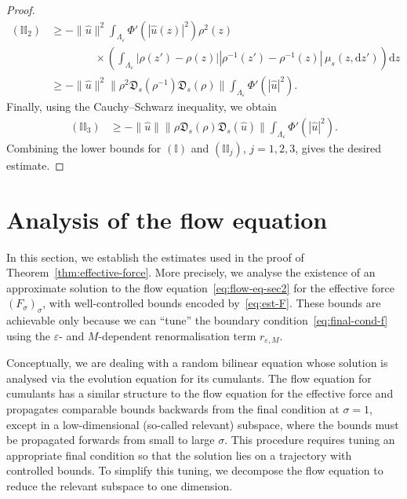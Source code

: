 \documentclass{article}
\numberwithin{equation}{section}
\newcommand{\mathd}{\mathrm{d}}
\theoremstyle{plain}
\theoremstyle{definition}
\begin{document}
\begin{proof}
  \[
  \begin{aligned}
  	(\mathbb{I}\mathbb{I}_2)
  	&\geqslant
  	-\|\hat u\|^2
  	\int_{\Lambda_\varepsilon}
  	\Phi'(|\hat u(z)|^2)\rho^2(z)
  	\\
  	&\qquad\qquad \times
  	\left(
  	\int_{\Lambda_\varepsilon}
  	|\rho(z')-\rho(z)|
  	|\rho^{-1}(z')-\rho^{-1}(z)|
  	\,\mu_s(z,\mathd z')
  	\right)\mathd z
  	\\
  	&\geqslant
  	-\|\hat u\|^2
  	\|\rho^2\mathfrak D_s(\rho^{-1})\mathfrak D_s(\rho)\|
  	\int_{\Lambda_\varepsilon}
  	\Phi'(|\hat u|^2).
  \end{aligned}
  \]
  Finally, using the Cauchy--Schwarz inequality, we obtain
  \[ \begin{aligned}
       (\mathbb{I}\mathbb{I}_3) & \geqslant  - \| \hat{u} \|  \| \rho
       \mathfrak{D}_s (\rho) \mathfrak{D}_s (\hat{u}) \|
       \int_{\Lambda_{\varepsilon}} \Phi' (| \hat{u} |^2) .
     \end{aligned} \]
  Combining the lower bounds for \((\mathbb I)\) and
     \((\mathbb{I}\mathbb{I}_j)\), \(j=1,2,3\), gives the desired estimate.
\end{proof}

\section{Analysis of the flow equation}\label{sec:flow}

In this section, we establish the estimates used in the proof of
Theorem~\ref{thm:effective-force}. More precisely, we analyse the existence of
an approximate solution to the flow equation~\eqref{eq:flow-eq-sec2} for the
effective force $(F_{\sigma})_{\sigma}$, with well-controlled bounds encoded
by~\eqref{eq:est-F}. These bounds are achievable only because we can ``tune''
the boundary condition~\eqref{eq:final-cond-f} using the $\varepsilon$- and
$M$-dependent renormalisation term $r_{\varepsilon, M}$.

Conceptually, we are dealing with a random bilinear equation whose solution is
analysed via the evolution equation for its cumulants. The flow equation for
cumulants has a similar structure to the flow equation for the effective force
and propagates comparable bounds backwards from the final condition at $\sigma
= 1$, except in a low-dimensional (so-called relevant) subspace, where the
bounds must be propagated forwards from small to large $\sigma$. This
procedure requires tuning an appropriate final condition so that the solution
lies on a trajectory with controlled bounds. To simplify this tuning, we
decompose the flow equation to reduce the relevant subspace to one dimension.
\end{document}

